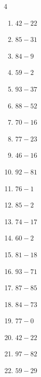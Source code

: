 \begin{multicols}{4}
\begin{enumerate}
  \item $42-22$
        \phantom{$=20$}

  \item $85-31$
        \phantom{$=54$}

  \item $84-9$
        \phantom{$=75$}

  \item $59-2$
        \phantom{$=57$}

  \item $93-37$
        \phantom{$=56$}

  \item $88-52$
        \phantom{$=36$}

  \item $70-16$
        \phantom{$=54$}

  \item $77-23$
        \phantom{$=54$}

  \item $46-16$
        \phantom{$=30$}

  \item $92-81$
        \phantom{$=11$}

  \item $76-1$
        \phantom{$=75$}

\columnbreak %

  \item $85-2$
        \phantom{$=83$}

  \item $74-17$
        \phantom{$=57$}

  \item $60-2$
        \phantom{$=58$}

  \item $81-18$
        \phantom{$=63$}

  \item $93-71$
        \phantom{$=22$}

  \item $87-85$
        \phantom{$=2$}

  \item $84-73$
        \phantom{$=11$}

  \item $77-0$
        \phantom{$=77$}

  \item $42-22$
        \phantom{$=20$}

  \item $97-82$
        \phantom{$=15$}

  \item $59-29$
        \phantom{$=30$}


\end{enumerate}
\end{multicols}
